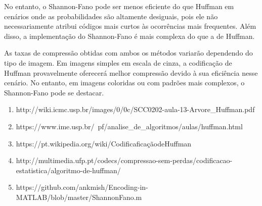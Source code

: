 \documentclass{article}
\begin{document}
No entanto, o Shannon-Fano pode ser menos eficiente do que Huffman em cenários onde as probabilidades são altamente desiguais, pois ele não necessariamente atribui códigos mais curtos às ocorrências mais frequentes. Além disso, a implementação do Shannon-Fano é mais complexa do que a de Huffman.

As taxas de compressão obtidas com ambos os métodos variarão dependendo do tipo de imagem. Em imagens simples em escala de cinza, a codificação de Huffman provavelmente oferecerá melhor compressão devido à sua eficiência nesse cenário. No entanto, em imagens coloridas ou com padrões mais complexos, o Shannon-Fano pode se destacar.
   


\begin{enumerate}
    \item 
    http://wiki.icmc.usp.br/images/0/0c/SCC0202-aula-13-Arvore\_Huffman.pdf
    \item https://www.ime.usp.br/~pf/analise\_de\_algoritmos/aulas/huffman.html
    \item https://pt.wikipedia.org/wiki/CodificaficaçãodeHuffman
    \item http://multimedia.ufp.pt/codecs/compressao-sem-perdas/codificacao-estatistica/algoritmo-de-huffman/
   \item https://github.com/ankmish/Encoding-in-MATLAB/blob/master/ShannonFano.m
\end{enumerate}
\end{document}
